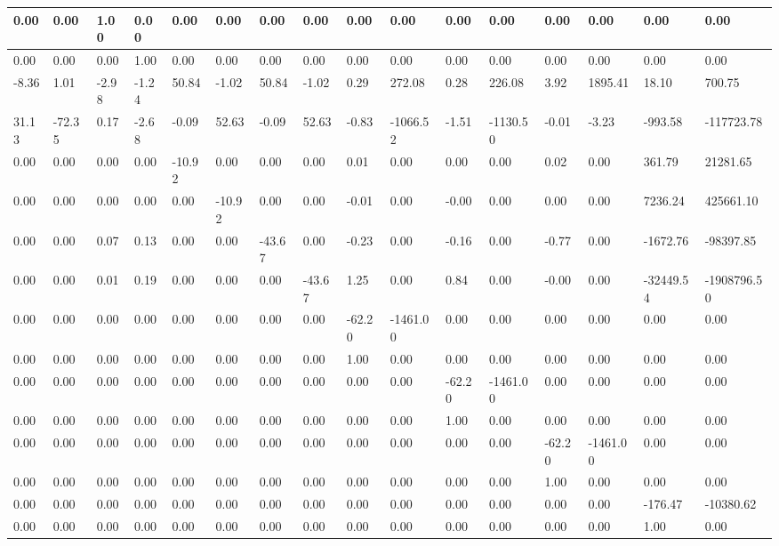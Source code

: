 \begin{tabular}{|l|l|l|l|l|l|l|l|l|l|l|l|l|l|l|l|}
\hline
0.00&0.00&1.00&0.00&0.00&0.00&0.00&0.00&0.00&0.00&0.00&0.00&0.00&0.00&0.00&0.00\\\hline
0.00&0.00&0.00&1.00&0.00&0.00&0.00&0.00&0.00&0.00&0.00&0.00&0.00&0.00&0.00&0.00\\\hline
-8.36&1.01&-2.98&-1.24&50.84&-1.02&50.84&-1.02&0.29&272.08&0.28&226.08&3.92&1895.41&18.10&700.75\\\hline
31.13&-72.35&0.17&-2.68&-0.09&52.63&-0.09&52.63&-0.83&-1066.52&-1.51&-1130.50&-0.01&-3.23&-993.58&-117723.78\\\hline
0.00&0.00&0.00&0.00&-10.92&0.00&0.00&0.00&0.01&0.00&0.00&0.00&0.02&0.00&361.79&21281.65\\\hline
0.00&0.00&0.00&0.00&0.00&-10.92&0.00&0.00&-0.01&0.00&-0.00&0.00&0.00&0.00&7236.24&425661.10\\\hline
0.00&0.00&0.07&0.13&0.00&0.00&-43.67&0.00&-0.23&0.00&-0.16&0.00&-0.77&0.00&-1672.76&-98397.85\\\hline
0.00&0.00&0.01&0.19&0.00&0.00&0.00&-43.67&1.25&0.00&0.84&0.00&-0.00&0.00&-32449.54&-1908796.50\\\hline
0.00&0.00&0.00&0.00&0.00&0.00&0.00&0.00&-62.20&-1461.00&0.00&0.00&0.00&0.00&0.00&0.00\\\hline
0.00&0.00&0.00&0.00&0.00&0.00&0.00&0.00&1.00&0.00&0.00&0.00&0.00&0.00&0.00&0.00\\\hline
0.00&0.00&0.00&0.00&0.00&0.00&0.00&0.00&0.00&0.00&-62.20&-1461.00&0.00&0.00&0.00&0.00\\\hline
0.00&0.00&0.00&0.00&0.00&0.00&0.00&0.00&0.00&0.00&1.00&0.00&0.00&0.00&0.00&0.00\\\hline
0.00&0.00&0.00&0.00&0.00&0.00&0.00&0.00&0.00&0.00&0.00&0.00&-62.20&-1461.00&0.00&0.00\\\hline
0.00&0.00&0.00&0.00&0.00&0.00&0.00&0.00&0.00&0.00&0.00&0.00&1.00&0.00&0.00&0.00\\\hline
0.00&0.00&0.00&0.00&0.00&0.00&0.00&0.00&0.00&0.00&0.00&0.00&0.00&0.00&-176.47&-10380.62\\\hline
0.00&0.00&0.00&0.00&0.00&0.00&0.00&0.00&0.00&0.00&0.00&0.00&0.00&0.00&1.00&0.00\\\hline
\end{tabular}
